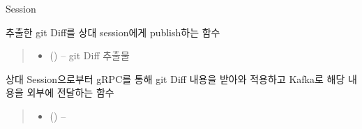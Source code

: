 \documentclass[a4paper,10pt,english]{sphinxmanual}
\begin{document}
\begin{fulllineitems}
\label{\detokenize{_Session:Session}}
\pysigstartsignatures
{}
\pysigstopsignatures
\sphinxAtStartPar
Session

\begin{fulllineitems}
\label{\detokenize{_Session:Session.Publish}}
\pysigstartsignatures
{}
\pysigstopsignatures
\sphinxAtStartPar
추출한 git Diff를 상대 session에게 publish하는 함수
\begin{quote}\begin{description}
\begin{itemize}
\item {} 
\sphinxAtStartPar
{} () – git Diff 추출물

\end{itemize}

\end{description}\end{quote}

\end{fulllineitems}


\begin{fulllineitems}
\label{\detokenize{_Session:Session.Subscribe}}
\pysigstartsignatures
{}
\pysigstopsignatures
\sphinxAtStartPar
상대 Session으로부터 gRPC를 통해 git Diff 내용을 받아와 적용하고 Kafka로 해당 내용을 외부에 전달하는 함수
\begin{quote}\begin{description}
\begin{itemize}
\item {} 
\sphinxAtStartPar
{} ({\hyperref[\detokenize{_Session:Session}]{}}) – 


\end{itemize}
\end{description}
\end{quote}
\end{fulllineitems}
\end{fulllineitems}
\end{document}
